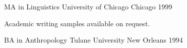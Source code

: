 

\begin{cventries}

  \cventry
  {MA in Linguistics} %
  {University of Chicago} %
  {Chicago} %
  {1999} %
  {
    \begin{cvitems} %
      \item {Academic writing samples available on request.}
    \end{cvitems}
  }


  \cventry
  {BA in Anthropology}
  {Tulane University}
  {New Orleans}
  {1994}
  {}


\end{cventries}
